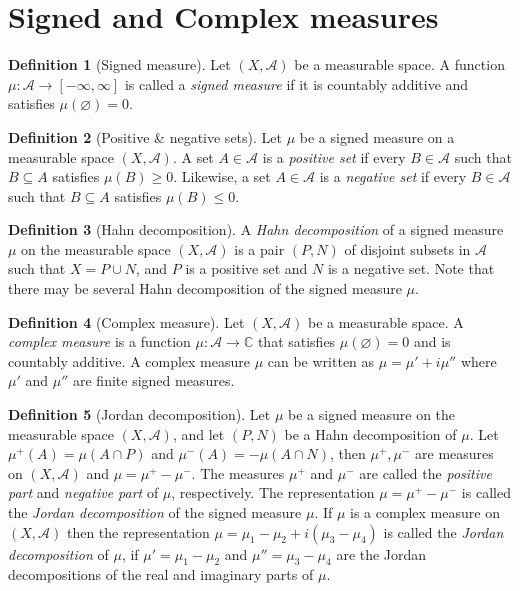 \documentclass[12pt]{article}
\theoremstyle{definition}
\newtheorem{definition}{Definition}[section]
\newcommand{\C}{\mathbb{C}}    %
\newcommand{\algebra}{\mathscr{A}}
\begin{document}
\section{Signed and Complex measures}
\begin{definition}[Signed measure]
    Let $(X,\algebra)$ be a measurable space. A function $\mu:\algebra\to[-\infty,\infty]$ is called a \textit{signed measure} if it is countably additive and satisfies $\mu(\varnothing)=0$. 
\end{definition}
\begin{definition}[Positive \& negative sets]
    Let $\mu$ be a signed measure on a measurable space $(X,\algebra)$. A set $A\in \algebra$ is a \textit{positive set} if every $B\in\algebra$ such that $B\subseteq A$ satisfies $\mu(B)\geq 0$. Likewise, a set $A\in\algebra$ is a \textit{negative set} if every $B\in \algebra$ such that $B\subseteq A$ satisfies $\mu(B)\leq 0$.
\end{definition}
\begin{definition}[Hahn decomposition]
    A \textit{Hahn decomposition} of a signed measure $\mu$ on the measurable space $(X,\algebra)$ is a pair $(P,N)$ of disjoint subsets in $\algebra$ such that $X=P\cup N$, and $P$ is a positive set and $N$ is a negative set. Note that there may be several Hahn decomposition of the signed measure $\mu$.
\end{definition}
\begin{definition}[Complex measure]
    Let $(X,\algebra)$ be a measurable space. A \textit{complex measure} is a function $\mu:\algebra\to\C$ that satisfies $\mu(\varnothing)=0$ and is countably additive. A complex measure $\mu$ can be written as $\mu=\mu'+i\mu''$ where $\mu'$ and $\mu''$ are finite signed measures. 
\end{definition}
\begin{definition}[Jordan decomposition]
    Let $\mu$ be a signed measure on the measurable space $(X,\algebra)$, and let $(P,N)$ be a Hahn decomposition of $\mu$. Let $\mu^+(A)=\mu(A\cap P)$ and $\mu^-(A)=-\mu(A\cap N)$, then $\mu^+,\mu^-$ are measures on $(X,\algebra)$ and $\mu=\mu^+-\mu^-$. The measures $\mu^+$ and $\mu^-$ are called the \textit{positive part} and \textit{negative part} of $\mu$, respectively. The representation $\mu=\mu^+-\mu^-$ is called the \textit{Jordan decomposition} of the signed measure $\mu$. If $\mu$ is a complex measure on $(X,\algebra)$ then the representation $\mu=\mu_1-\mu_2 +i(\mu_3-\mu_4)$ is called the \textit{Jordan decomposition} of $\mu$, if $\mu'=\mu_1-\mu_2$ and $\mu''=\mu_3-\mu_4$ are the Jordan decompositions of the real and imaginary parts of $\mu$.
\end{definition}
\end{document}

